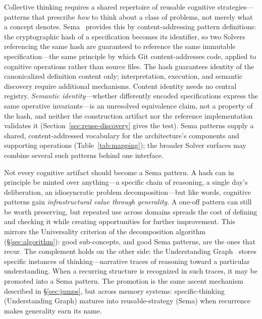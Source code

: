 \documentclass[11pt]{article}
\begin{document}
Collective thinking requires a shared repertoire of reusable cognitive strategies---patterns that prescribe \emph{how} to think about a class of problems, not merely what a concept denotes. Sema~\cite{westerberg2026sema} provides this by content-addressing pattern definitions: the cryptographic hash of a specification becomes its identifier, so two Solvers referencing the same hash are guaranteed to reference the same immutable specification---the same principle by which Git content-addresses code, applied to cognitive operations rather than source files. The hash guarantees identity of the canonicalized definition content only; interpretation, execution, and semantic discovery require additional mechanisms. Content identity needs no central registry. \emph{Semantic identity}---whether differently encoded specifications express the same operative invariants---is an unresolved equivalence claim, not a property of the hash, and neither the construction artifact nor the reference implementation validates it (Section~\ref{sec:reuse-discovery} gives the test). Sema patterns supply a shared, content-addressed vocabulary for the architecture's components and supporting operations (Table~\ref{tab:mapping}); the broader Solver surfaces may combine several such patterns behind one interface.

Not every cognitive artifact should become a Sema pattern. A hash can in principle be minted over anything---a specific chain of reasoning, a single day's deliberation, an idiosyncratic problem decomposition---but like words, cognitive patterns gain \emph{infrastructural value through generality}. A one-off pattern can still be worth preserving, but repeated use across domains spreads the cost of defining and checking it while creating opportunities for further improvement. This mirrors the Universality criterion of the decomposition algorithm (\S\ref{sec:algorithm}): good sub-concepts, and good Sema patterns, are the ones that recur. The complement holds on the other side: the Understanding Graph~\cite{westerberg2026understanding} stores specific instances of thinking---narrative traces of reasoning toward a particular understanding. When a recurring structure is recognized in such traces, it may be promoted into a Sema pattern. The promotion is the same ascent mechanism described in \S\ref{sec:jumps}, but across memory systems: specific-thinking (Understanding Graph) matures into reusable-strategy (Sema) when recurrence makes generality earn its name.
\end{document}
